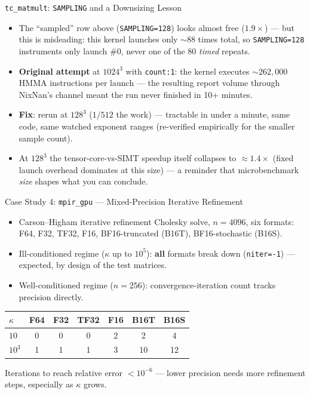 \documentclass[aspectratio=169,11pt]{beamer}
\begin{document}
\begin{frame}{\texttt{tc\_matmult}: \texttt{SAMPLING} and a Downsizing Lesson}
\begin{itemize}
  \item The ``sampled'' row above (\texttt{SAMPLING=128}) looks almost free
    ($1.9\times$) --- but this is misleading: this kernel launches only
    $\sim\!88$ times total, so \texttt{SAMPLING=128} instruments only launch
    \#0, never one of the 80 \emph{timed} repeats.
  \item \textbf{Original attempt} at $1024^3$ with \texttt{count:1}: the
    kernel executes $\sim\!262{,}000$ HMMA instructions per launch --- the
    resulting report volume through NixNan's channel meant the run never
    finished in 10+ minutes.
  \item \textbf{Fix}: rerun at $128^3$ ($1/512$ the work) --- tractable in
    under a minute, same code, same watched exponent ranges (re-verified
    empirically for the smaller sample count).
  \item At $128^3$ the tensor-core-vs-SIMT speedup itself collapses to
    $\approx\!1.4\times$ (fixed launch overhead dominates at this size) ---
    a reminder that microbenchmark \emph{size} shapes what you can conclude.
\end{itemize}
\end{frame}

\begin{frame}{Case Study 4: \texttt{mpir\_gpu} --- Mixed-Precision Iterative Refinement}
\begin{itemize}
  \item Carson--Higham iterative refinement Cholesky solve, $n{=}4096$,
    six formats: F64, F32, TF32, F16, BF16-truncated (B16T), BF16-stochastic (B16S).
  \item Ill-conditioned regime ($\kappa$ up to $10^5$): \textbf{all} formats
    break down (\texttt{niter=-1}) --- expected, by design of the test matrices.
  \item Well-conditioned regime ($n{=}256$): convergence-iteration count
    tracks precision directly.
\end{itemize}
\begin{center}
\scriptsize
\begin{tabular}{lcccccc}
\toprule
$\kappa$ & F64 & F32 & TF32 & F16 & B16T & B16S \\
\midrule
$10$ & 0 & 0 & 0 & 2 & 2 & 4 \\
$10^3$ & 1 & 1 & 1 & 3 & 10 & 12 \\
\bottomrule
\end{tabular}
\end{center}
Iterations to reach relative error $<10^{-6}$ --- lower precision needs more refinement steps, especially as $\kappa$ grows.
\end{frame}
\end{document}
